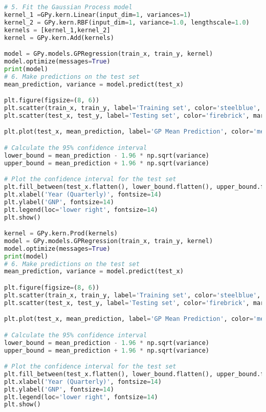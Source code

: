 \documentclass[12pt,a4paper]{article}
\begin{document}
\begin{lstlisting}[language=python, caption={Code of the Creation of Figures \ref{fig:Orange County plot},\ref{fig:SE+Lin Gpregression}, \ref{fig:SE*Lin Gpregression}}]
# 5. Fit the Gaussian Process model
kernel_1 =GPy.kern.Linear(input_dim=1, variances=1)
kernel_2 = GPy.kern.RBF(input_dim=1, variance=1.0, lengthscale=1.0)
kernels = [kernel_1,kernel_2]
kernel = GPy.kern.Add(kernels)

model = GPy.models.GPRegression(train_x, train_y, kernel)
model.optimize(messages=True)
print(model)
# 6. Make predictions on the test set
mean_prediction, variance = model.predict(test_x)

plt.figure(figsize=(8, 6))
plt.scatter(train_x, train_y, label='Training set', color='steelblue', marker='x', s=50)
plt.scatter(test_x, test_y, label='Testing set', color='firebrick', marker='x', s=50)

plt.plot(test_x, mean_prediction, label='GP Mean Prediction', color='mediumpurple', linewidth=3)

# Calculate the 95% confidence interval
lower_bound = mean_prediction - 1.96 * np.sqrt(variance)
upper_bound = mean_prediction + 1.96 * np.sqrt(variance)

# Plot the confidence interval for the test set
plt.fill_between(test_x.flatten(), lower_bound.flatten(), upper_bound.flatten(), color='plum', alpha=0.3, label='Credible Interval (95%)')
plt.xlabel('Year (Quarterly)', fontsize=14)
plt.ylabel('GNP', fontsize=14)
plt.legend(loc='lower right', fontsize=14)
plt.show()

kernel = GPy.kern.Prod(kernels)
model = GPy.models.GPRegression(train_x, train_y, kernel)
model.optimize(messages=True)
print(model)
# 6. Make predictions on the test set
mean_prediction, variance = model.predict(test_x)

plt.figure(figsize=(8, 6))
plt.scatter(train_x, train_y, label='Training set', color='steelblue', marker='x', s=50)
plt.scatter(test_x, test_y, label='Testing set', color='firebrick', marker='x', s=50)

plt.plot(test_x, mean_prediction, label='GP Mean Prediction', color='mediumpurple', linewidth=3)

# Calculate the 95% confidence interval
lower_bound = mean_prediction - 1.96 * np.sqrt(variance)
upper_bound = mean_prediction + 1.96 * np.sqrt(variance)

# Plot the confidence interval for the test set
plt.fill_between(test_x.flatten(), lower_bound.flatten(), upper_bound.flatten(), color='plum', alpha=0.3, label='Credible Interval (95%)')
plt.xlabel('Year (Quarterly)', fontsize=14)
plt.ylabel('GNP', fontsize=14)
plt.legend(loc='lower right', fontsize=14)
plt.show()
\end{lstlisting}
\end{document}

